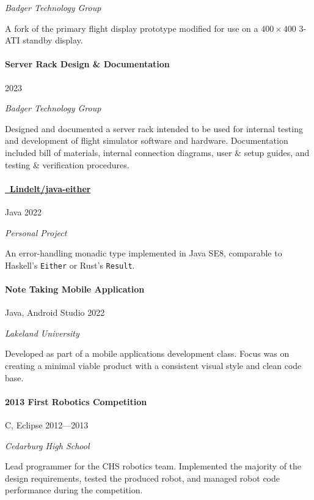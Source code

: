 \documentclass[10pt]{article}
\newcommand{\Rplus}{\protect\raisebox{0.35ex}{\smaller{\smaller{\textbf{+}}}}}
\newcommand{\Cpp}{\mbox{C\Rplus\Rplus}}
\newcommand{\firstpar}{\vspace{4pt}\noindent}
\begin{document}
\noindent
\textit{Badger Technology Group}

\firstpar
A fork of the primary flight display prototype modified for use on a $400\!\times\!400$ 3-ATI
standby display.

\paragraph{Server Rack Design \& Documentation}
\hfill 2023

\noindent
\textit{Badger Technology Group}

\firstpar
Designed and documented a server rack intended to be used for internal testing and development
of flight simulator software and hardware. Documentation included bill of materials, internal
connection diagrams, user \& setup guides, and testing \& verification procedures.

\paragraph{\href{https://github.com/Lindelt/java-either}{\faGithub\ Lindelt/java-either}}
\vline\quad Java \hfill 2022

\noindent
\textit{Personal Project}

\firstpar
An error-handling monadic type implemented in Java SE8, comparable to Haskell's \texttt{Either} or
Rust's \texttt{Result}.

\paragraph{Note Taking Mobile Application}
\vline\quad Java, Android Studio \hfill 2022

\noindent
\textit{Lakeland University}

\firstpar
Developed as part of a mobile applications development class. Focus was on creating a minimal
viable product with a consistent visual style and clean code base.

\paragraph{2013 First Robotics Competition}
\vline\quad \Cpp, Eclipse \hfill 2012---2013

\noindent
\textit{Cedarburg High School}

\firstpar
Lead programmer for the CHS robotics team. Implemented the majority of the design
requirements, tested the produced robot, and managed robot code performance during
the competition.
\end{document}
